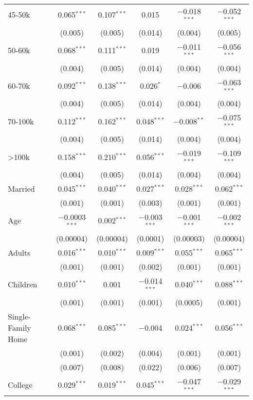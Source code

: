 \begin{table}[!htbp]
{\begin{tabular}{@{\extracolsep{5pt}}lccccc}
  45-50k & 0.065$^{***}$ & 0.107$^{***}$ & 0.015 & $-$0.018$^{***}$ & $-$0.052$^{***}$ \\
  & (0.005) & (0.005) & (0.014) & (0.004) & (0.005) \\
  50-60k & 0.068$^{***}$ & 0.111$^{***}$ & 0.019 & $-$0.011$^{***}$ & $-$0.056$^{***}$ \\
  & (0.004) & (0.005) & (0.014) & (0.004) & (0.004) \\
  60-70k & 0.092$^{***}$ & 0.138$^{***}$ & 0.026$^{*}$ & $-$0.006 & $-$0.063$^{***}$ \\
  & (0.004) & (0.005) & (0.014) & (0.004) & (0.004) \\
  70-100k & 0.112$^{***}$ & 0.162$^{***}$ & 0.048$^{***}$ & $-$0.008$^{**}$ & $-$0.075$^{***}$ \\
  & (0.004) & (0.005) & (0.014) & (0.004) & (0.004) \\
  >100k & 0.158$^{***}$ & 0.210$^{***}$ & 0.056$^{***}$ & $-$0.019$^{***}$ & $-$0.109$^{***}$ \\
  & (0.004) & (0.005) & (0.014) & (0.004) & (0.004) \\
  Married & 0.045$^{***}$ & 0.040$^{***}$ & 0.027$^{***}$ & 0.028$^{***}$ & 0.062$^{***}$ \\
  & (0.001) & (0.001) & (0.003) & (0.001) & (0.001) \\
  Age & $-$0.0003$^{***}$ & 0.002$^{***}$ & $-$0.003$^{***}$ & $-$0.001$^{***}$ & $-$0.002$^{***}$ \\
  & (0.00004) & (0.00004) & (0.0001) & (0.00003) & (0.00004) \\
  Adults & 0.016$^{***}$ & 0.010$^{***}$ & 0.009$^{***}$ & 0.055$^{***}$ & 0.065$^{***}$ \\
  & (0.001) & (0.001) & (0.002) & (0.001) & (0.001) \\
  Children & 0.010$^{***}$ & 0.001 & $-$0.014$^{***}$ & 0.040$^{***}$ & 0.088$^{***}$ \\
  & (0.001) & (0.001) & (0.001) & (0.0005) & (0.001) \\
  Single-Family Home & 0.068$^{***}$ & 0.085$^{***}$ & $-$0.004 & 0.024$^{***}$ & 0.056$^{***}$ \\
  & (0.001) & (0.002) & (0.004) & (0.001) & (0.001) \\
  & (0.007) & (0.008) & (0.022) & (0.006) & (0.007) \\
  College & 0.029$^{***}$ & 0.019$^{***}$ & 0.045$^{***}$ & $-$0.047$^{***}$ & $-$0.029$^{***}$ \\

\end{tabular}}
\end{table}
